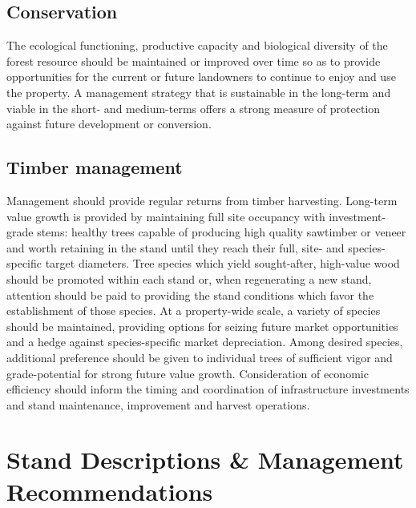 \documentclass[]{tufte-handout}
\begin{document}
\subsection{Conservation}\label{conservation}

The ecological functioning, productive capacity and biological diversity
of the forest resource should be maintained or improved over time so as
to provide opportunities for the current or future landowners to
continue to enjoy and use the property. A management strategy that is
sustainable in the long-term and viable in the short- and medium-terms
offers a strong measure of protection against future development or
conversion.

\subsection{Timber management}\label{timber-management}

Management should provide regular returns from timber harvesting.
Long-term value growth is provided by maintaining full site occupancy
with investment-grade stems: healthy trees capable of producing high
quality sawtimber or veneer and worth retaining in the stand until they
reach their full, site- and species-specific target diameters. Tree
species which yield sought-after, high-value wood should be promoted
within each stand or, when regenerating a new stand, attention should be
paid to providing the stand conditions which favor the establishment of
those species. At a property-wide scale, a variety of species should be
maintained, providing options for seizing future market opportunities
and a hedge against species-specific market depreciation. Among desired
species, additional preference should be given to individual trees of
sufficient vigor and grade-potential for strong future value growth.
Consideration of economic efficiency should inform the timing and
coordination of infrastructure investments and stand maintenance,
improvement and harvest operations.

\section{Stand Descriptions \& Management
Recommendations}\label{stand-descriptions-management-recommendations}
\end{document}
